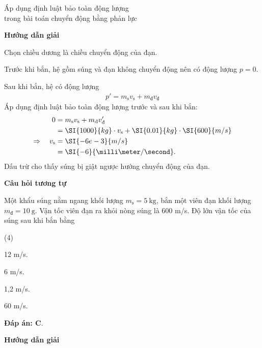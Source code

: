 \begin{dang}{Áp dụng định luật bảo toàn động lượng \\trong bài toán chuyển động bằng phản lực}
	{	\begin{center}
			\textbf{Hướng dẫn giải}
		\end{center}
		Chọn chiều dương là chiều chuyển động của đạn. 
		
		Trước khi bắn, hệ gồm súng và đạn không chuyển động nên có động lượng $p=0$.
		
		Sau khi bắn, hệ có động lượng 
		\begin{align*}
			p'=m_\text{s}v_\text{s}+m_\text{đ}v_\text{đ}
		\end{align*}
		Áp dụng định luật bảo toàn động lượng trước và sau khi bắn:
		\begin{align*}
			0 &= m_\text{s}v_\text{s} + m_\text{đ}v_\text{đ}'\\
			&= \SI{1000}{kg} \cdot v_\text s + \SI{0.01}{kg} \cdot \SI{600}{m/s}\\ 
			\Rightarrow\quad v_\text s &= \SI{-6e-3}{m/s}\\
			&=\SI{-6}{\milli\meter/\second}.
		\end{align*}
		Dấu trừ cho thấy súng bị giật ngược hướng chuyển động của đạn.
		
		
		\begin{center}
			\textbf{Câu hỏi tương tự}
		\end{center}
		
		Một khẩu súng nằm ngang khối lượng $m_\text{s} = 5\ \text{kg}$, bắn một viên đạn khối lượng $m_\text{đ} = 10\ \text{g}$. Vận tốc viên đạn ra khỏi nòng súng là 600 m/s. Độ lớn vận tốc của súng sau khi bắn bằng
		\begin{mcq}(4)
			\item 12 m/s.	
			\item 6 m/s.
			\item 1,2 m/s.	
			\item 60 m/s.
		\end{mcq}
		
		\textbf{Đáp án: C}.
	}
	{\begin{center}
			\textbf{Hướng dẫn giải}
		\end{center}
		
}
\end{dang}

